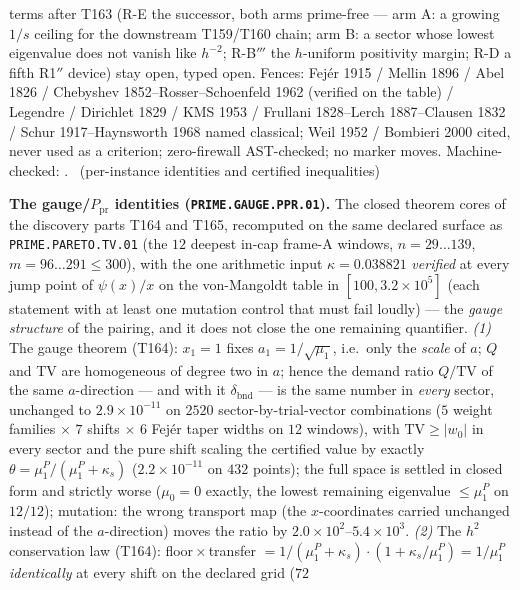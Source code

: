\documentclass[11pt,a4paper]{article}
\begin{document}
terms after T163 (R-E the successor, both arms prime-free --- arm A: a
growing $1/s$ ceiling for the downstream T159/T160 chain; arm B: a
sector whose lowest eigenvalue does not vanish like $h^{-2}$; R-B$'''$
the $h$-uniform positivity margin; R-D a fifth R1$''$ device) stay
open, typed open. Fences: Fej\'er 1915 / Mellin 1896 / Abel 1826 /
Chebyshev 1852--Rosser--Schoenfeld 1962 (verified on the table) /
Legendre / Dirichlet 1829 / KMS 1953 / Frullani 1828--Lerch
1887--Clausen 1832 / Schur 1917--Haynsworth 1968 named classical; Weil
1952 / Bombieri 2000 cited, never used as a criterion; zero-firewall
AST-checked; no marker moves.
Machine-checked: .
\mE\ (per-instance identities and certified inequalities)

\par\smallskip\noindent\textbf{The gauge/$P_{\mathrm{pr}}$ identities
(\texttt{PRIME.GAUGE.PPR.01}).}
The closed theorem cores of the discovery parts T164 and T165,
recomputed on the same declared surface as
\texttt{PRIME.PARETO.TV.01} (the $12$ deepest in-cap frame-A windows,
$n=29\ldots139$, $m=96\ldots291\le300$), with the one arithmetic input
$\kappa=0.038821$ \emph{verified} at every jump point of $\psi(x)/x$ on
the von-Mangoldt table in $[100,3.2\times10^{5}]$ (each statement with
at least one mutation control that must fail loudly) --- the \emph{gauge
structure} of the pairing, and it does not close the one remaining
quantifier. \emph{(1)} The gauge theorem (T164): $x_1=1$ fixes
$a_1=1/\sqrt{\mu_1}$, i.e.\ only the \emph{scale} of $a$; $Q$ and TV are
homogeneous of degree two in $a$; hence the demand ratio
$Q/\mathrm{TV}$ of the same $a$-direction --- and with it
$\delta_{\mathrm{bnd}}$ --- is the same number in \emph{every} sector,
unchanged to $2.9\times10^{-11}$ on $2520$ sector-by-trial-vector
combinations ($5$ weight families $\times$ $7$ shifts $\times$ $6$
Fej\'er taper widths on $12$ windows), with $\mathrm{TV}\ge|w_0|$ in
every sector and the pure shift scaling the certified value by exactly
$\theta=\mu^P_1/(\mu^P_1+\kappa_s)$ ($2.2\times10^{-11}$ on $432$
points); the full space is settled in closed form and strictly worse
($\mu_0=0$ exactly, the lowest remaining eigenvalue $\le\mu^P_1$ on
$12/12$); mutation: the wrong transport map (the $x$-coordinates
carried unchanged instead of the $a$-direction) moves the ratio by
$2.0\times10^{2}$--$5.4\times10^{3}$. \emph{(2)} The $h^2$ conservation
law (T164): floor${}\times{}$transfer
$=1/(\mu^P_1+\kappa_s)\cdot(1+\kappa_s/\mu^P_1)=1/\mu^P_1$
\emph{identically} at every shift on the declared grid ($72$
\end{document}
